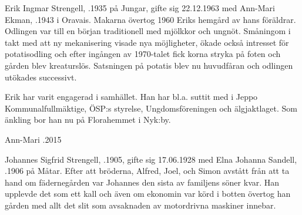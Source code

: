 Erik Ingmar Strengell, .1935 på Jungar, gifte sig 22.12.1963 med Ann-Mari Ekman, .1943 i Oravais. Makarna övertog 1960 Eriks hemgård av hans föräldrar. Odlingen var till en början traditionell med mjölkkor och ungnöt. Småningom i takt med att ny mekanisering visade nya möjligheter, ökade också intresset för potatisodling och efter ingången av 1970-talet fick korna stryka på foten och gården blev kreaturslös. Satsningen på potatis blev nu huvudfåran och odlingen utökades successivt.

Erik har varit engagerad i samhället. Han har bl.a. suttit med i Jeppo Kommunalfullmäktige, ÖSP:s styrelse, Ungdomsföreningen och älgjaktlaget. Som änkling bor han nu på Florahemmet i Nyk:by.
\begin{jhchildren}
  \item {}
  \item {}
  \item {}
  \item {}
\end{jhchildren}

Ann-Mari .2015


Johannes Sigfrid Strengell, .1905, gifte sig 17.06.1928 med Elna Johanna Sandell, .1906 på Måtar. Efter att bröderna, Alfred, Joel, och Simon avstått från att ta hand om fädernegården var Johannes den sista av familjens söner kvar. Han upplevde det som ett kall och även om ekonomin var körd i botten övertog han gården med allt det slit som avsaknaden av motordrivna maskiner innebar.

